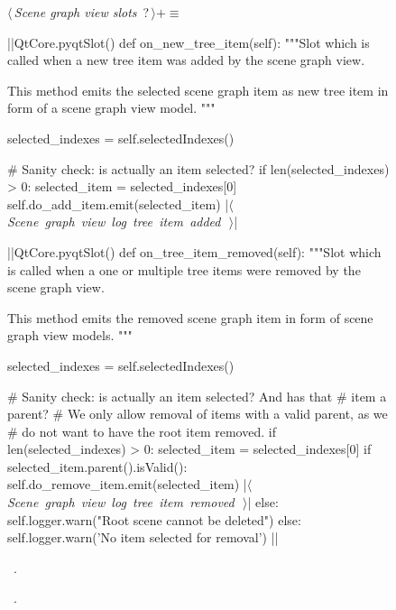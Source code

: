 \documentclass[%
    a4paper,    %
    justified,  %
    nobib,      %
    openany     %
]{tufte-book}
\makeatletter
\renewcommand{\label}[1]{\@tufte@label{##1}}%
\makeatother
\begin{document}
\begin{figure}
\begin{flushleft} \small
\begin{minipage}{\linewidth}\label{scrap49}\raggedright\small
{} $\langle\,${\itshape Scene graph view slots}\nobreak\ {\footnotesize {?}}$\,\rangle+\equiv$
\vspace{-1ex}
\begin{pythoncode}
|\normalfont{}\fontfamily{}|QtCore.pyqtSlot()
def on_new_tree_item(self):
    """Slot which is called when a new tree item was added by the
    scene graph view.

    This method emits the selected scene graph item as new tree
    item in form of a scene graph view model.
    """

    selected_indexes = self.selectedIndexes()

    # Sanity check: is actually an item selected?
    if len(selected_indexes) > 0:
        selected_item = selected_indexes[0]
        self.do_add_item.emit(selected_item)
        |\hbox{$\langle\,${\itshape Scene graph view log tree item added}\nobreak\ {\footnotesize {}}$\,\rangle$}|

|\normalfont{}\fontfamily{}|QtCore.pyqtSlot()
def on_tree_item_removed(self):
    """Slot which is called when a one or multiple tree items
    were removed by the scene graph view.

    This method emits the removed scene graph item in form of
    scene graph view models.
    """

    selected_indexes = self.selectedIndexes()

    # Sanity check: is actually an item selected? And has that
    # item a parent?
    # We only allow removal of items with a valid parent, as we
    # do not want to have the root item removed.
    if len(selected_indexes) > 0:
        selected_item = selected_indexes[0]
        if selected_item.parent().isValid():
            self.do_remove_item.emit(selected_item)
            |\hbox{$\langle\,${\itshape Scene graph view log tree item removed}\nobreak\ {\footnotesize {}}$\,\rangle$}|
        else:
            self.logger.warn("Root scene cannot be deleted")
    else:
        self.logger.warn('No item selected for removal')
|\NWsep|
\end{pythoncode}
\vspace{1.5ex}
\footnotesize
\begin{list}{}{\setlength{\itemsep}{-\parsep}\setlength{\itemindent}{-\leftmargin}}
\item \NWtxtMacroDefBy\ .
\item \NWtxtMacroRefIn\ .


\end{list}
\end{minipage}
\end{flushleft}
\end{figure}
\end{document}
